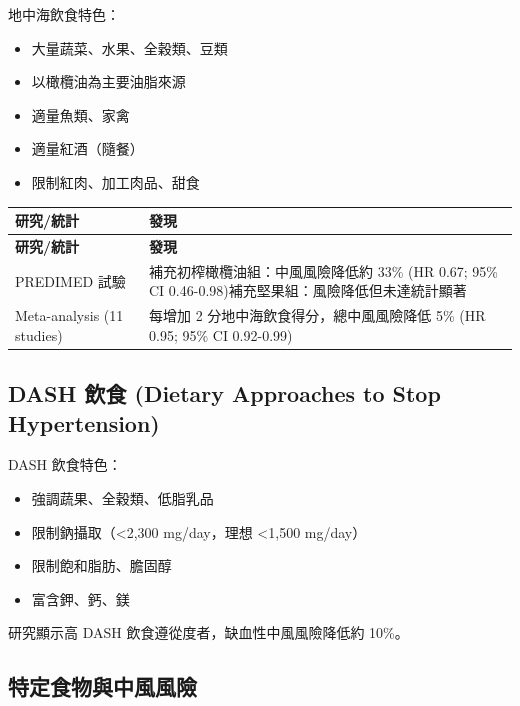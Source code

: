 \documentclass[12pt,a4paper]{article}
\begin{document}
地中海飲食特色：
\begin{itemize}
    \item 大量蔬菜、水果、全穀類、豆類
    \item 以橄欖油為主要油脂來源
    \item 適量魚類、家禽
    \item 適量紅酒（隨餐）
    \item 限制紅肉、加工肉品、甜食
\end{itemize}

\begin{longtable}{p{5cm}p{9cm}}
\toprule
\textbf{研究/統計} & \textbf{發現} \\
\midrule
\endfirsthead
\toprule
\textbf{研究/統計} & \textbf{發現} \\
\midrule
\endhead
\bottomrule
\endfoot

PREDIMED 試驗 & 補充初榨橄欖油組：中風風險降低約 33\% (HR 0.67; 95\% CI 0.46-0.98)\newline 補充堅果組：風險降低但未達統計顯著 \\
\midrule
Meta-analysis (11 studies) & 每增加 2 分地中海飲食得分，總中風風險降低 5\% (HR 0.95; 95\% CI 0.92-0.99) \\
\bottomrule
\end{longtable}

\subsection{DASH 飲食 (Dietary Approaches to Stop Hypertension)}

DASH 飲食特色：
\begin{itemize}
    \item 強調蔬果、全穀類、低脂乳品
    \item 限制鈉攝取（<2,300 mg/day，理想 <1,500 mg/day）
    \item 限制飽和脂肪、膽固醇
    \item 富含鉀、鈣、鎂
\end{itemize}

研究顯示高 DASH 飲食遵從度者，缺血性中風風險降低約 10\%。

\subsection{特定食物與中風風險}
\end{document}
